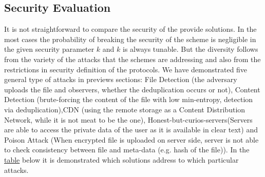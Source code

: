 \documentclass[12pt]{article}
\begin{document}
\subsection{Security Evaluation}
\label{sub:SecurityEva}
It is not straightforward to compare the security of the provide solutions. In the most cases the probability of breaking the security of the scheme is negligible in the given security parameter $k$ and $k$ is always tunable. But the diversity follows from the variety of the attacks that the schemes are addressing and also from the restrictions  in security definition of the protocols. We have demonstrated five general type of attacks in previews sections: File Detection (the adversary uploads the file and observers, whether the deduplication occurs or not), Content Detection (brute-forcing  the content of the file with low min-entropy, detection via deduplication),CDN (using the remote storage as a Content Distribution
Network, while it is not meat to be the one),  Honest-but-curios-servers(Servers are able to access the private data of the user as it is available in clear text) and Poison Attack (When encrypted file is uploaded on server side, server is not able to check consistency between file and meta-data (e.g. hash of the file)). In the \hyperref[table:Attacks]{table} below it is demonstrated which solutions address to which particular attacks.\\\\
\end{document}

